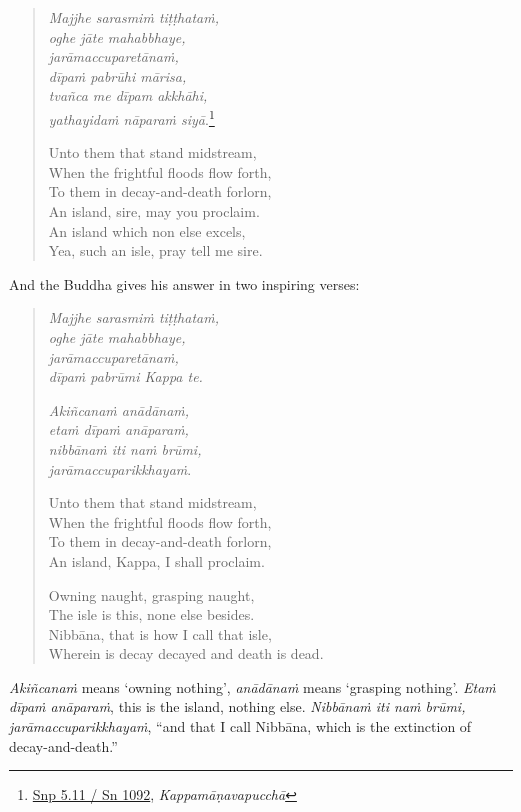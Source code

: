 \begin{quote}
\emph{Majjhe sarasmiṁ tiṭṭhataṁ,}\\
\emph{oghe jāte mahabbhaye,}\\
\emph{jarāmaccuparetānaṁ,}\\
\emph{dīpaṁ pabrūhi mārisa,}\\
\emph{tvañca me dīpam akkhāhi,}\\
\emph{yathayidaṁ nāparaṁ siyā}.\footnote{\href{https://suttacentral.net/snp5.11/pli/ms}{Snp 5.11 / Sn 1092}, \emph{Kappamāṇavapucchā}}

Unto them that stand midstream,\\
When the frightful floods flow forth,\\
To them in decay-and-death forlorn,\\
An island, sire, may you proclaim.\\
An island which non else excels,\\
Yea, such an isle, pray tell me sire.
\end{quote}

And the Buddha gives his answer in two inspiring verses:

\enlargethispage{\baselineskip}

\begin{quote}
\emph{Majjhe sarasmiṁ tiṭṭhataṁ,}\\
\emph{oghe jāte mahabbhaye,}\\
\emph{jarāmaccuparetānaṁ,}\\
\emph{dīpaṁ pabrūmi Kappa te.}

\emph{Akiñcanaṁ anādānaṁ,}\\
\emph{etaṁ dīpaṁ anāparaṁ,}\\
\emph{nibbānaṁ iti naṁ brūmi,}\\
\emph{jarāmaccuparikkhayaṁ}.

Unto them that stand midstream,\\
When the frightful floods flow forth,\\
To them in decay-and-death forlorn,\\
An island, Kappa, I shall proclaim.

Owning naught, grasping naught,\\
The isle is this, none else besides.\\
Nibbāna, that is how I call that isle,\\
Wherein is decay decayed and death is dead.
\end{quote}

\emph{Akiñcanaṁ} means `owning nothing', \emph{anādānaṁ} means `grasping nothing'. \emph{Etaṁ dīpaṁ anāparaṁ}, this is the island, nothing else. \emph{Nibbānaṁ iti naṁ brūmi, jarāmaccuparikkhayaṁ}, ``and that I call Nibbāna, which is the extinction of decay-and-death.''

